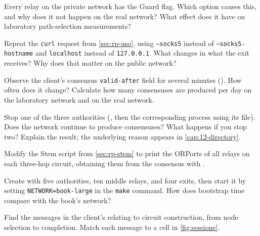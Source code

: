 \begin{esercizio}[1]\label{es:19-guard}
Every relay on the private network has the Guard flag. Which option causes this, and why does it not happen on the real network? What effect does it have on laboratory path-selection measurements?
\end{esercizio}

\begin{esercizio}[1]\label{es:19-socks}
Repeat the \texttt{curl} request from \cref{sec:rp-uso}, using \texttt{--socks5} instead of \texttt{--socks5-hostname} and \texttt{localhost} instead of \texttt{127.0.0.1}. What changes in what the exit receives? Why does that matter on the public network?
\end{esercizio}

\begin{esercizio}[2]\label{es:19-consenso}
Observe the client's consensus \texttt{valid-after} field for several minutes (). How often does it change? Calculate how many consensuses are produced per day on the laboratory network and on the real network.
\end{esercizio}

\begin{esercizio}[2]\label{es:19-autorita}
Stop one of the three authorities (, then  the corresponding process using its  file). Does the network continue to produce consensuses? What happens if you stop two? Explain the result; the underlying reason appears in \cref{cap:12-directory}.
\end{esercizio}

\begin{esercizio}[2]\label{es:19-stem}
Modify the Stem script from \cref{sec:rp-stem} to print the ORPorts of all relays on each three-hop circuit, obtaining them from the consensus with .
\end{esercizio}

\begin{esercizio}[2]\label{es:19-rete}
Create  with five authorities, ten middle relays, and four exits, then start it by setting \texttt{NETWORK=book-large} in the \texttt{make} command. How does bootstrap time compare with the book's network?
\end{esercizio}

\begin{esercizio}[3]\label{es:19-log}
Find the messages in the client's  relating to circuit construction, from node selection to completion. Match each message to a cell in \cref{fig:sessione}.
\end{esercizio}

